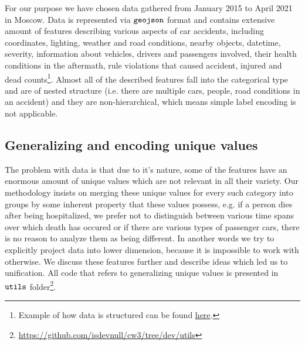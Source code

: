 For our purpose we have chosen data gathered from January 2015 to April 2021 in Moscow.
Data is represented via $\verb|geojson|$ format and contains extensive amount of features
describing various aspects of car accidents, including
coordinates, lighting, weather and road conditions, nearby objects, datetime,
severity, information about vehicles, drivers and passengers involved,
their health conditions in the aftermath, rule violations that caused accident,
injured and dead counts\footnote{Example of how data is structured can be found \href{https://dtp-stat.ru/opendata/}{here}.}.
Almost all of the described features fall into the categorical type and are of nested structure
(i.e. there are multiple cars, people, road conditions in an accident) and they are non-hierarchical,
which means simple label encoding is not applicable.
\subsection{Generalizing and encoding unique values}
The problem with data is that due to it's nature, some of the features have an enormous amount of unique values which are not
relevant in all their variety. Our methodology insists on
merging these unique values for every such category into groups by some inherent property that these values possess,
e.g. if a person dies after being hospitalized, we prefer not to distinguish between various time spans over
which death has occured or if there are various types of passenger cars, there is no reason to analyze them
as being different. In another words we try to explicitly project data into lower dimension,
because it is impossible to work with otherwise.
We discuss these features further and describe ideas which led us to unification. All code that refers to generalizing
unique values is presented in $\verb|utils|$ folder\footnote
{\href{https://github.com/isdevnull/cw3/tree/dev/utils}{https://github.com/isdevnull/cw3/tree/dev/utils}}. 
